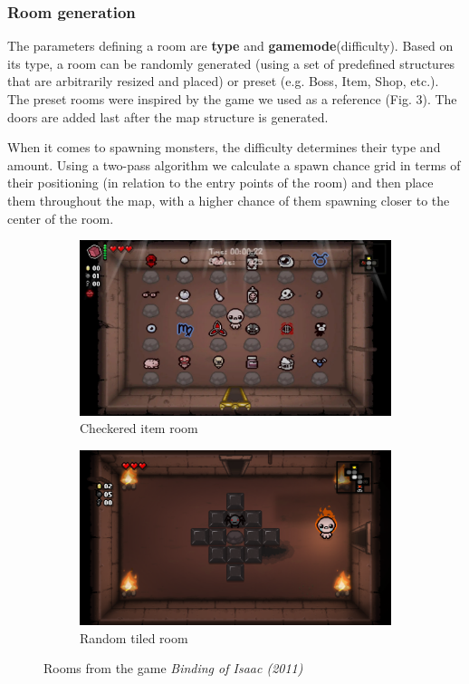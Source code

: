 \documentclass{article}
\begin{document}
\subsubsection{Room generation}
The parameters defining a room are \textbf{type} and \textbf{gamemode}(difficulty). Based on its type, a room can be randomly generated (using a set of predefined structures that are arbitrarily resized and placed) or preset (e.g. Boss, Item, Shop, etc.). The preset rooms were inspired by the game we used as a reference (Fig. 3). The doors are added last after the map structure is generated.\par
When it comes to spawning monsters, the difficulty determines their type and amount. Using a two-pass algorithm we calculate a spawn chance grid in terms of their positioning (in relation to the entry points of the room) and then place them throughout the map, with a higher chance of them spawning closer to the center of the room.
\begin{figure}[H]
\centering
\begin{subfigure}{.5\textwidth}
  \centering
  \includegraphics[width=0.9\linewidth]{images/checkeredRoom.png}
  \caption{Checkered item room}
  \label{fig:sub4}
\end{subfigure}%
\begin{subfigure}{.5\textwidth}
  \centering
  \includegraphics[width=0.9\linewidth]{images/randomTile.png}
  \caption{Random tiled room}
  \label{fig:sub5}
\end{subfigure}
\caption{Rooms from the game \textit{Binding of Isaac (2011)}}
\label{fig:test2}
\end{figure}
\end{document}
